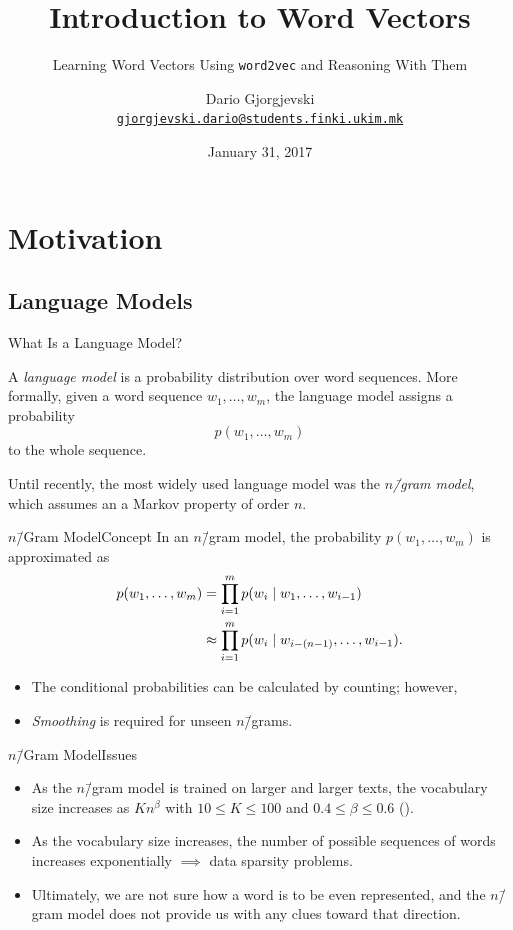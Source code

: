 \documentclass[usepdftitle=false]{beamer}
\title{Introduction to Word Vectors}%
\subtitle{Learning Word Vectors Using \Verb+word2vec+ and Reasoning
  With Them}%
\author[Dario Gj.]{%
  Dario Gjorgjevski\inst{1}\\%
  \href{mailto:gjorgjevski.dario@students.finki.ukim.mk}%
  {\nolinkurl{gjorgjevski.dario@students.finki.ukim.mk}}%
}%
\institute[FCSE]{%
  \inst{1}Faculty of Computer Science and Engineering\\%
  Ss.\ Cyril and Methodius University in Skopje%
}%
\date{January 31, 2017}%
\theoremstyle{definition}
\begin{document}
\begin{frame}
  \titlepage%
\end{frame}

\section{Motivation}

\subsection{Language Models}

\begin{frame}{What Is a Language Model?}
  \begin{definition}
    A \emph{language model} is a probability distribution over word
    sequences.  More formally, given a word sequence
    \(w_1, \ldots, w_m\), the language model assigns a probability
    \[
      p(w_1, \ldots, w_m)
    \]
    to the whole sequence.
  \end{definition}
  Until recently, the most widely used language model was the
  \emph{\(n\)\=/gram model}, which assumes an a Markov property of
  order \(n\).
\end{frame}

\begin{frame}{\(n\)\=/Gram Model}{Concept}
  In an \(n\)\=/gram model, the probability \(p(w_1, \ldots, w_m)\) is
  approximated as
  \begin{align*}
    p(w_1, \ldots, w_m) &= \prod_{i = 1}^{m} p(w_i \mid w_1, \ldots, w_{i - 1})\\
                        &\approx \prod_{i = 1}^{m} p(w_i \mid w_{i - (n - 1)}, \ldots, w_{i - 1})\text.
  \end{align*}
  \begin{itemize}
  \item The conditional probabilities can be calculated by counting;
    \alert{however},
  \item \emph{Smoothing} is required for unseen \(n\)\=/grams.
  \end{itemize}
\end{frame}

\begin{frame}{\(n\)\=/Gram Model}{Issues}
  \begin{itemize}
  \item As the \(n\)\=/gram model is trained on larger and larger
    texts, the vocabulary size increases as \(K n^{\beta}\) with
    \(10 \le K \le 100\) and \(0.4 \le \beta \le 0.6\)
    ().
  \item As the vocabulary size increases, the number of possible
    sequences of words increases exponentially \(\implies\) data
    sparsity problems.
  \item Ultimately, we are not sure how a word is to be even
    represented, and the \(n\)\=/gram model does not provide us with
    any clues toward that direction.
  \end{itemize}
\end{frame}
\end{document}
